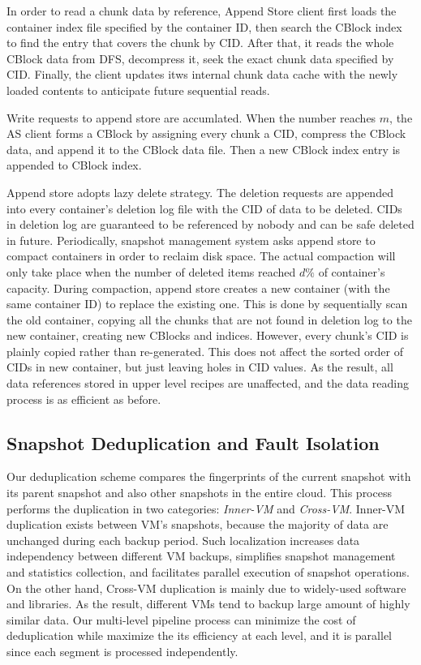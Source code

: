 In order to read a chunk data by reference, Append Store client first loads the
container index file specified by the container ID, then search the CBlock index to find the entry that covers the chunk by CID.
After that, it reads the whole CBlock data from DFS, decompress it, seek the exact chunk data specified by CID. 
Finally, the client updates itws internal chunk data cache with the newly loaded contents to anticipate future sequential reads.

Write requests to append store are accumlated. When the number reaches $m$, the AS client forms a CBlock by assigning 
every chunk a CID, compress the CBlock data, and append it to the CBlock data file. Then a new CBlock index entry is appended
to CBlock index.

Append store adopts lazy delete strategy. The deletion requests are appended into every container's deletion log file with the CID of data to be deleted.
CIDs in deletion log are guaranteed to be referenced by nobody and can be safe deleted in future. 
Periodically, snapshot management system asks append store to compact containers in order to reclaim disk space. 
The actual compaction will only take place when the number of deleted items reached $d\%$ of container's capacity. 
During compaction, append store creates a new container (with the same container ID) to replace the 
existing one. This is done by sequentially scan the old container, copying all the chunks that are not 
found in deletion log to the new container, creating new CBlocks and indices. 
However, every chunk's CID is plainly copied rather than re-generated. This does not affect the sorted
order of CIDs in new container, but just leaving holes in CID values. As the result, all data references stored 
in upper level recipes are unaffected, and the data reading process is as efficient as before.

\subsection{Snapshot Deduplication and Fault Isolation}
\label{sect:dedupe}
Our  deduplication scheme compares the fingerprints of the current snapshot
with its parent snapshot and also other snapshots in the entire cloud.
This process performs   the duplication in two categories: \textit{Inner-VM} and \textit{Cross-VM}. 
Inner-VM duplication exists between VM's snapshots, because the majority of data are unchanged during each backup period. 
Such localization increases data independency between different VM backups,
simplifies snapshot management and statistics collection,
and facilitates parallel execution of snapshot operations.
On the other hand, Cross-VM duplication is mainly due to widely-used software and libraries. 
As the result, different VMs tend to backup large amount of highly similar data.
Our multi-level pipeline process can minimize 
the cost of deduplication while maximize the its efficiency at each level,
and it is parallel since each segment is processed independently.

